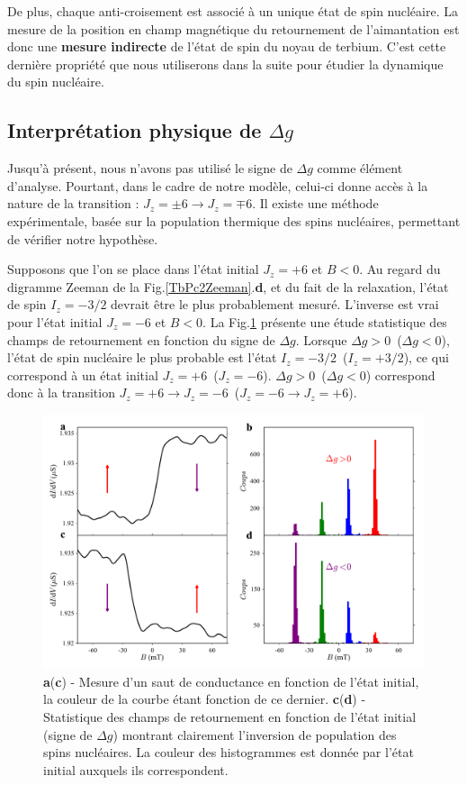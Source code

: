 De plus, chaque anti-croisement est associé à un unique état de spin nucléaire. La mesure de la position en champ magnétique du retournement de l'aimantation est donc une \textbf{mesure indirecte} de l'état de spin du noyau de terbium. C'est cette dernière propriété que nous utiliserons dans la suite pour étudier la dynamique du spin nucléaire.

\subsection{Interprétation physique de $\Delta g$}
Jusqu'à présent, nous n'avons pas utilisé le signe de $\Delta g$ comme élément d'analyse. Pourtant, dans le cadre de notre modèle, celui-ci donne accès à la nature de la transition : $J_z = \pm6 \rightarrow J_z = \mp 6$. Il existe une méthode expérimentale, basée sur la population thermique des spins nucléaires, permettant de vérifier notre hypothèse.

Supposons que l'on se place dans l'état initial $J_z=+6$ et $B<0$. Au regard du digramme Zeeman de la Fig.\ref{TbPc2Zeeman}.\textbf{d}, et du fait de la relaxation, l'état de spin $I_z = -3/2$ devrait être le plus probablement mesuré. L'inverse est vrai pour l'état initial $J_z=-6$ et $B<0$. La Fig.\ref{analyse_signe_saut} présente une étude statistique des champs de retournement en fonction du signe de $\Delta g$. Lorsque $\Delta g> 0$~($\Delta g< 0$), l'état de spin nucléaire le plus probable est l'état $I_z = -3/2$~($I_z = +3/2$), ce qui correspond à un état initial $J_z=+6$~($J_z=-6$). $\Delta g> 0$~($\Delta g< 0$) correspond donc à la transition $J_z = +6 \rightarrow J_z =  - 6$~($J_z = -6 \rightarrow J_z =  + 6$).

\begin{figure}
\includegraphics[scale=0.45]{Resultats/JumpSens/JumpSens.pdf} 
\caption{\textbf{a}(\textbf{c}) - Mesure d'un saut de conductance en fonction de l'état initial, la couleur de la courbe étant fonction de ce dernier. \textbf{c}(\textbf{d}) - Statistique des champs de retournement en fonction de l'état initial (signe de $\Delta g$) montrant clairement l'inversion de population des spins nucléaires. La couleur des histogrammes est donnée par l'état initial auxquels ils correspondent.}
\label{analyse_signe_saut}
\end{figure}

